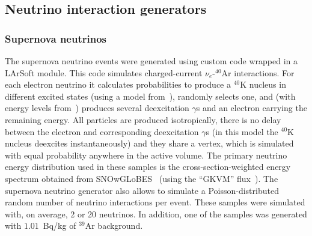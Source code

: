 
\subsection{Neutrino interaction generators} 
\label{sec:tools-mc-gen}




\subsubsection{Supernova neutrinos}

The supernova neutrino events were generated using custom code wrapped in a LArSoft module.
This code simulates charged-current $\nu_e$-$^{40}$Ar interactions.
For each electron neutrino it calculates probabilities to produce a $^{40}$K nucleus
in different excited states (using a model from~\cite{Bhattacharya:1998hc}),
randomly selects one, and (with energy levels from~\cite{Cameron:2004myb}) 
produces several deexcitation $\gamma$s and an electron carrying the remaining energy.
All particles are produced isotropically,
there is no delay between the electron and corresponding deexcitation $\gamma$s
(in this model the $^{40}$K nucleus deexcites instantaneously) and they share a vertex,
which is simulated with equal probability anywhere in the active volume.
The primary neutrino energy distribution used in these samples is the cross-section-weighted 
energy spectrum obtained from SNOwGLoBES~\cite{snowglobes} (using the ``GKVM'' flux~\cite{GKVM}).
The supernova neutrino generator also allows to simulate a Poisson-distributed random number 
of neutrino interactions per event. These samples were simulated with, on average, 2 or 20 neutrinos.
In addition, one of the samples was generated with $1.01$~Bq/kg of $^{39}$Ar background.

